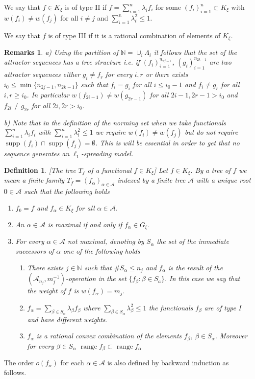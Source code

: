 \documentclass[a4paper]{amsart}
\theoremstyle{plain}
\newtheorem{definition}[theorem]{Definition}
\newtheorem{remarks}[theorem]{Remarks}
\newcommand{\N}{\mathbb{N}}
\newcommand{\mc}{\mathcal}
\newcommand{\mca}[1][A]{\mathcal{#1}}
\newcommand{\fa}{f_{\alpha}}
\newcommand{\fb}{f_{\beta}}
\DeclareMathOperator{\supp}{supp}
\DeclareMathOperator{\ran}{range}
\begin{document}
We say that $f\in K_{\xi}$ is of type II if
$f=\sum_{i=1}^{n}\lambda_{i}f_{i}$ for some
$(f_{i})_{i=1}^{n}\subset K_{\xi}$ with $w(f_{i})\ne w(f_{j})$  for all
$i\ne j$ and $\sum_{i=1}^{n}\lambda_{i}^{2}\leq 1$.

We say that  $f$ is of type III if it is a rational combination of elements of $K_{\xi}$.
\begin{remarks}\label{r3.2}
a) Using the partition of $\N=\cup_{i}\Lambda_{i}$ it  follows
that the set of the attractor sequences has a tree structure i.e. if
$(f_{i})_{i=1}^{n_{2j-1}}$, $(g_{i})_{i=1}^{n_{2k-1}}$ are two
attractor sequences either $g_{i}\ne f_{r}$ for every  $i,r$ or
there exists  $i_0\leq\min\{n_{2j-1},n_{2k-1}\}$ such that
$f_{i}=g_{i}$ for all $i\leq i_0-1$ and $f_{i}\ne g_{r}$ for all
$i,r\geq i_0$. In particular $w(f_{2i-1})\ne w(g_{2r-1})$ for all
$2i-1,2r-1>i_0$ and $f_{2i}\ne g_{2r}$ for all $2i,2r>i_0$.


b) Note that in the definition of the norming set when we take
functionals $\sum_{i=1}^{n}\lambda_{i}f_{i}$ with
$\sum_{i=1}^n\lambda_{i}^{2}\leq 1$ we  require $w(f_{i})\ne
w(f_{j})$ but do not require
$\supp(f_i)\cap\supp(f_{j})=\emptyset$.  This is will be essential
in order to get that no sequence  generates an  $\ell_{1}$-spreading
model.
\end{remarks}
\begin{definition}\label{def3.3}[The tree $T_{f}$ of a functional $f\in K_{\xi}$] Let $f\in K_{\xi}$. By a tree of $f$ we mean a finite family $T_{f}=(\fa)_{\alpha\in\mca}$ indexed by a finite tree $\mca$ with a unique root $0\in\mca$ such that the following holds
\begin{enumerate}
 \item $f_{0}=f$ and $\fa\in K_{\xi}$ for all $\alpha\in\mca.$
\item An $\alpha\in\mca$ is maximal if and only if $\fa\in G_{\xi}$.
\item For every $\alpha\in\mca$ not maximal, denoting by $S_{\alpha}$ the set of the immediate successors of $\alpha$ one of the following holds
\begin{enumerate}
\item There exists $j\in\N$ such that $\# S_\alpha\leq n_{j}$ and $\fa$ is the result  of
the  $(\mc{A}_{n_j},m_{j}^{-1})$-operation in the set $\{f_{\beta}: \beta\in S_{a}\}$. In
this case we say that the weight of $f$ is $w(\fa)=m_{j}$. \item  $\fa=\sum_{\beta\in
S_{\alpha}}\lambda_{\beta}f_{\beta}$ where $\sum_{\beta\in
S_{\alpha}}\lambda_{\beta}^{2}\leq 1$  the functionals $\fb$ are of type I and have
different weights. \item  $\fa$ is a rational convex combination of the elements
$f_{\beta}$, $\beta\in S_{\alpha}$. Moreover for every  $\beta\in S_{\alpha}$ $\ran
f_{\beta}\subset\ran \fa$
\end{enumerate}
\end{enumerate}
\end{definition}
The order $o(\fa)$ for each $\alpha\in\mca$ is also defined by backward induction as follows.
\end{document}
